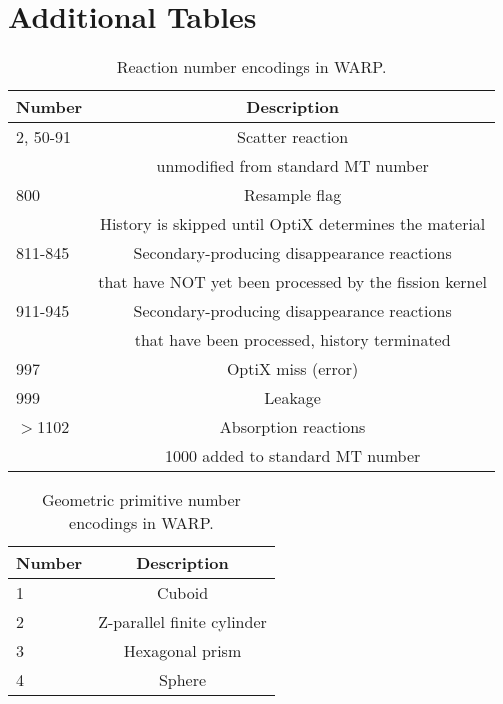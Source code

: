 \chapter{Additional Tables}


\begin{table}[h]
\centering
\caption{Reaction number encodings in WARP.}
\label{WARP_rxn_numbers}
\begin{tabular}{| l | c |}
\hline
Number &  Description \\
\hline
2, 50-91	  &   Scatter reaction \\
& unmodified from standard MT number  \\
\hline
800 &  Resample flag \\
&  History is skipped until OptiX determines the material \\
\hline
811-845 & Secondary-producing disappearance reactions \\
 & that have NOT yet been processed by the fission kernel \\
\hline
911-945 & Secondary-producing disappearance reactions \\
& that have been processed, history terminated \\
\hline
997	&  OptiX miss (error) \\
\hline
999	&   Leakage	\\
\hline
$>$1102 & Absorption reactions \\
& 1000 added to standard MT number\\
\hline
\end{tabular}
\end{table}

\begin{table}[h]
\centering
\caption{Geometric primitive number encodings in WARP.}
\label{WARP_geom_numbers}
\begin{tabular}{| l | c |}
\hline
Number &  Description \\
\hline
1	  &   Cuboid  \\
\hline
2 	&  Z-parallel finite cylinder \\
\hline
3	&   Hexagonal prism	\\
\hline
4     & Sphere \\
\hline
\end{tabular}
\end{table}


